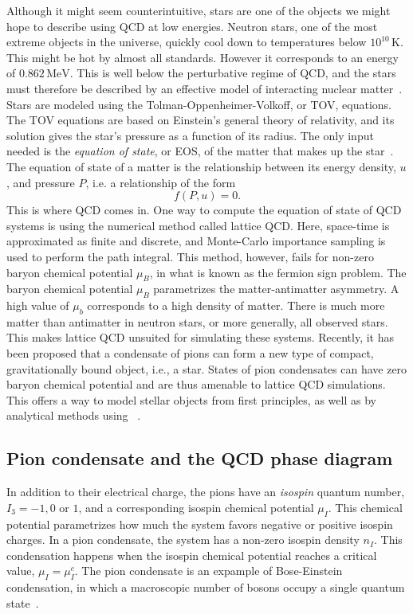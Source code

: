 Although it might seem counterintuitive, stars are one of the objects we might hope to describe using QCD at low energies.
Neutron stars, one of the most extreme objects in the universe, quickly cool down to temperatures below $10^{10} \, \text{K}$.
This might be hot by almost all standards.
However it corresponds to an energy of $0.862 \, \text{MeV}$.
This is well below the perturbative regime of QCD, and the stars must therefore be described by an effective model of interacting nuclear matter~\cite{glendenning:compcat_stars,from_hadrons_to_quarks}.
Stars are modeled using the Tolman-Oppenheimer-Volkoff, or TOV, equations.
The TOV equations are based on Einstein's general theory of relativity, and its solution gives the star's pressure as a function of its radius.
The only input needed is the \emph{equation of state}, or EOS, of the matter that makes up the star~\cite{Carroll:spacetime}.
The equation of state of a matter is the relationship between its energy density, $u$, and pressure $P$, i.e. a relationship of the form
\begin{equation}
    f(P, u) = 0.
\end{equation}
This is where QCD comes in.
One way to compute the equation of state of QCD systems is using the numerical method called lattice QCD.
Here, space-time is approximated as finite and discrete, and Monte-Carlo importance sampling is used to perform the path integral.
This method, however, fails for non-zero baryon chemical potential $\mu_B$, in what is known as the fermion sign problem.
The baryon chemical potential $\mu_B$ parametrizes the matter-antimatter asymmetry.
A high value of $\mu_b$ corresponds to a high density of matter.
There is much more matter than antimatter in neutron stars, or more generally, all observed stars.
This makes lattice QCD unsuited for simulating these systems.
Recently, it has been proposed that a condensate of pions can form a new type of compact, gravitationally bound object, i.e., a star.
States of pion condensates can have zero baryon chemical potential and are thus amenable to lattice QCD simulations.
This offers a way to model stellar objects from first principles, as well as by analytical methods using \chpt~\cite{new_clas_of_compact_stars,andersen:bose_einstein}.

\subsection*{Pion condensate and the QCD phase diagram}

In addition to their electrical charge, the pions have an \emph{isospin} quantum number, $I_3 = -1, 0$ or $1$, and a corresponding isospin chemical potential $\mu_I$.
This chemical potential parametrizes how much the system favors negative or positive isospin charges.
In a pion condensate, the system has a non-zero isospin density $n_I$.
This condensation happens when the isospin chemical potential reaches a critical value, $\mu_I = \mu_I^c$.
The pion condensate is an expample of Bose-Einstein condensation, in which a macroscopic number of bosons occupy a single quantum state~\cite{Brandt:QCD_phase_diagram_with_isospin_chemical_potential,Brandt:QCD_phase_diagram_for_nonzero_isospin-asymmetry,mannarelli:meson_condensation}.


